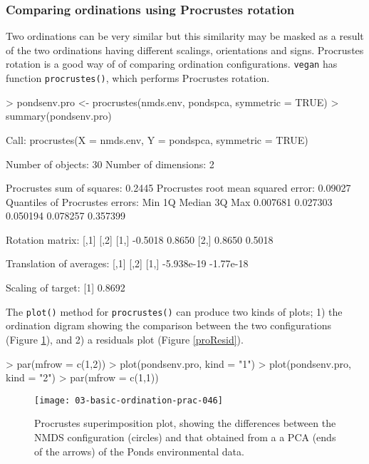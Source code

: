 \documentclass[a4paper,10pt]{article}
\newcommand{\vegan}{\texttt{vegan}\xspace}
\begin{document}
{\subsubsection{Comparing ordinations using Procrustes rotation}
Two ordinations can be very similar but this similarity may be masked as a result of the two ordinations having different scalings, orientations and signs. Procrustes rotation is a good way of of comparing ordination configurations. \vegan has function \texttt{procrustes()}, which performs Procrustes rotation.

\begin{Schunk}
\begin{Sinput}
> pondsenv.pro <- procrustes(nmds.env, pondspca, symmetric = TRUE)
> summary(pondsenv.pro)
\end{Sinput}
\begin{Soutput}
Call:
procrustes(X = nmds.env, Y = pondspca, symmetric = TRUE) 

Number of objects: 30    Number of dimensions: 2 

Procrustes sum of squares:  
 0.2445 
Procrustes root mean squared error: 
 0.09027 
Quantiles of Procrustes errors:
     Min       1Q   Median       3Q      Max 
0.007681 0.027303 0.050194 0.078257 0.357399 

Rotation matrix:
        [,1]   [,2]
[1,] -0.5018 0.8650
[2,]  0.8650 0.5018

Translation of averages:
           [,1]      [,2]
[1,] -5.938e-19 -1.77e-18

Scaling of target:
[1] 0.8692
\end{Soutput}
\end{Schunk}

The \texttt{plot()} method for \texttt{procrustes()} can produce two kinds of plots; 1) the ordination digram showing the comparison between the two configurations (Figure \ref{proOrd}), and 2) a residuals plot (Figure \ref{proResid}).

\begin{Schunk}
\begin{Sinput}
> par(mfrow = c(1,2))
> plot(pondsenv.pro, kind = "1")
> plot(pondsenv.pro, kind = "2")
> par(mfrow = c(1,1))
\end{Sinput}
\end{Schunk}

\begin{figure}[t]
\begin{center}
\texttt{[image: 03-basic-ordination-prac-046]}
\caption{\label{proOrd}Procrustes superimposition plot, showing the differences between the NMDS configuration (circles) and that obtained from a a PCA (ends of the arrows) of the Ponds environmental data.}
\end{center}
\end{figure}

}
\end{document}
